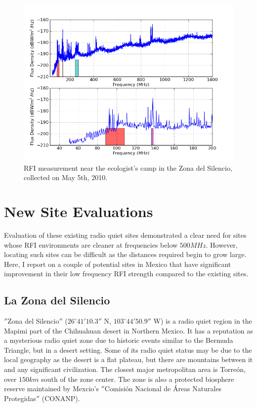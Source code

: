 \begin{figure}[htb]
\begin{center}
\includegraphics[width=0.9\linewidth]{RFI_testing/figures/ZdS_halfway_in_bands.png}
\caption{RFI measurement near the ecologist's camp in the Zona del Silencio, collected on May 5th, 2010.}
\label{Fig:zdsendrfi}
\end{center}
\end{figure}



\section{New Site Evaluations}

Evaluation of these existing radio quiet sites demonstrated a clear need for sites whose RFI environments are cleaner at frequencies below $500 MHz$. However, locating such sites can be difficult as the distances required begin to grow large. Here, I report on a couple of potential sites in Mexico that have significant improvement in their low frequency RFI strength compared to the existing sites. 


\subsection{La Zona del Silencio}

$''$Zona del Silencio$''$ ($26^\circ 41' 10.3''$ N, $103^\circ 44' 50.9''$ W) is a radio quiet region in the Mapimi part of the Chihuahuan desert in Northern Mexico. It has a reputation as a mysterious radio quiet zone due to historic events similar to the Bermuda Triangle, but in a desert setting. Some of its radio quiet status may be due to the local geography as the desert is a flat plateau, but there are mountains between it and any significant civilization. The closest major metropolitan area is Torre\'{o}n, over $150 km$ south of the zone center. The zone is also a protected biosphere reserve maintained by Mexcio's $''$Comisi\'{o}n Nacional de \'{A}reas Naturales Protegidas$''$ (CONANP). 

